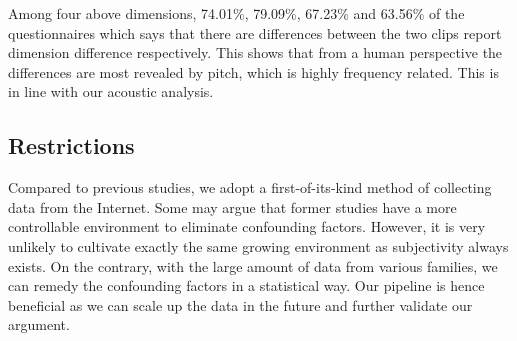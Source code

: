 Among four above dimensions, 74.01\%, 79.09\%, 67.23\% and 63.56\% of the questionnaires which says that there are differences between the two clips report dimension difference respectively. This shows that from a human perspective the differences are most revealed by pitch, which is highly frequency related. This is in line with our acoustic analysis.




\subsection{Restrictions}
Compared to previous studies, we adopt a first-of-its-kind method of collecting data from the  Internet. Some may argue that former studies have a more controllable environment to eliminate confounding factors. However, it is very unlikely to cultivate exactly the same growing environment as subjectivity always exists. On the contrary, with the large amount of data from various families, we can remedy the confounding factors in a statistical way. Our pipeline is hence beneficial as we can scale up the data in the future and further validate our argument.
